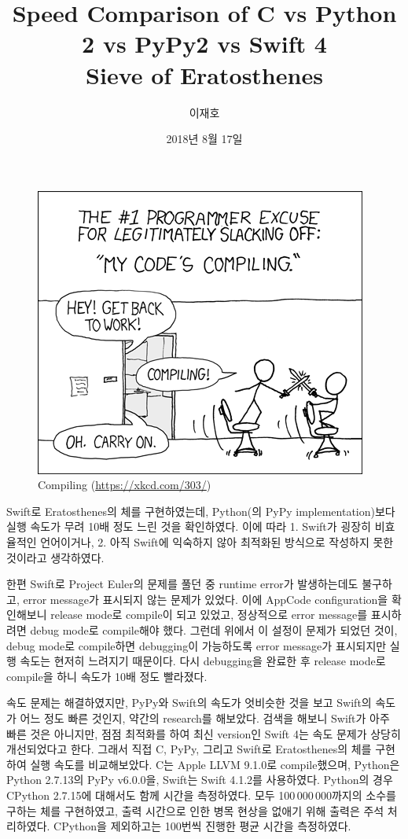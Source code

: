 \documentclass[a4paper, 10pt]{oblivoir}
\title{Speed Comparison of C vs Python 2 vs PyPy2 vs Swift 4\\\Large{Sieve of Eratosthenes}}
\author{이재호}
\date{2018년 8월 17일}
\theoremstyle{definition}
\begin{document}
\maketitle

\begin{figure}[H]
\centering
\includegraphics[width=0.7\linewidth]{"./compiling"}
\caption{Compiling (\url{https://xkcd.com/303/})}
\end{figure}

Swift로 Eratosthenes의 체를 구현하였는데, Python(의 PyPy implementation)보다 실행 속도가 무려 10배 정도 느린 것을 확인하였다.
이에 따라 1. Swift가 굉장히 비효율적인 언어이거나, 2. 아직 Swift에 익숙하지 않아 최적화된 방식으로 작성하지 못한 것이라고 생각하였다.

한편 Swift로 Project Euler의 문제를 풀던 중 runtime error가 발생하는데도 불구하고, error message가 표시되지 않는 문제가 있었다.
이에 AppCode configuration을 확인해보니 release mode로 compile이 되고 있었고, 정상적으로 error message를 표시하려면 debug mode로 compile해야 했다.
그런데 위에서 이 설정이 문제가 되었던 것이, debug mode로 compile하면 debugging이 가능하도록 error message가 표시되지만 실행 속도는 현저히 느려지기 때문이다.
다시 debugging을 완료한 후 release mode로 compile을 하니 속도가 10배 정도 빨라졌다.

속도 문제는 해결하였지만, PyPy와 Swift의 속도가 엇비슷한 것을 보고 Swift의 속도가 어느 정도 빠른 것인지, 약간의 research를 해보았다.
검색을 해보니 Swift가 아주 빠른 것은 아니지만, 점점 최적화를 하여 최신 version인 Swift 4는 속도 문제가 상당히 개선되었다고 한다.
그래서 직접 C, PyPy, 그리고 Swift로 Eratosthenes의 체를 구현하여 실행 속도를 비교해보았다.
C는 Apple LLVM 9.1.0로 compile했으며, Python은 Python 2.7.13의 PyPy v6.0.0을, Swift는 Swift 4.1.2를 사용하였다.
Python의 경우 CPython 2.7.15에 대해서도 함께 시간을 측정하였다.
모두 100\,000\,000까지의 소수를 구하는 체를 구현하였고, 출력 시간으로 인한 병목 현상을 없애기 위해 출력은 주석 처리하였다.
CPython을 제외하고는 100번씩 진행한 평균 시간을 측정하였다.
\end{document}
